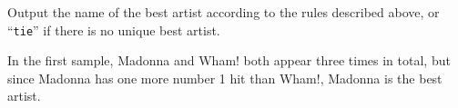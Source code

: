 \begin{Output}
    Output the name of the best artist according to the rules described above, or ``\texttt{tie}'' if there is no unique best artist.
\end{Output}

In the first sample, Madonna and Wham! both appear three times in total, but since Madonna has one more number 1 hit than Wham!, Madonna is the best artist.
